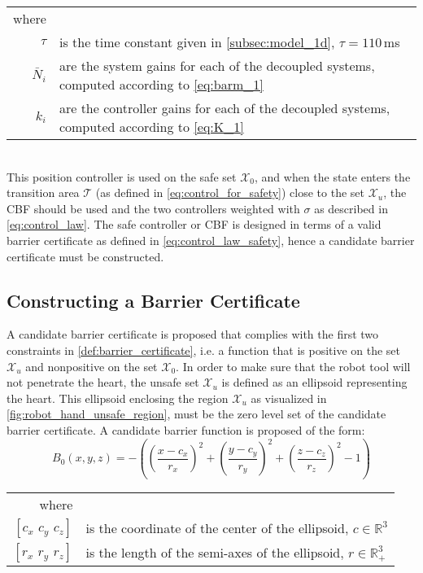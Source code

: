 \begin{tabular}{rl}
where & \\
$\tau$ & is the time constant given in \autoref{subsec:model_1d}, $\tau = 110$\,ms\\
$\bar{N}_i$ & are the system gains for each of the decoupled systems, computed according to \autoref{eq:barm_1}\\
$k_i$ & are the controller gains for each of the decoupled systems, computed according to \autoref{eq:K_1}\\
\end{tabular}\\

This position controller is used on the safe set $\mathcal{X}_0$, and when the state enters the transition area $\mathcal{T}$ (as defined in \autoref{eq:control_for_safety}) close to the set $\mathcal{X}_u$, the CBF should be used and the two controllers weighted with $\sigma$ as described in \autoref{eq:control_law}. The safe controller or CBF is designed in terms of a valid barrier certificate as defined in \autoref{eq:control_law_safety}, hence a candidate barrier certificate must be constructed.

\subsection{Constructing a Barrier Certificate}
A candidate barrier certificate is proposed that complies with the first two constraints in \autoref{def:barrier_certificate}, i.e. a function that is positive on the set $\mathcal{X}_u$ and nonpositive on the set $\mathcal{X}_0$. In order to make sure that the robot tool will not penetrate the heart, the unsafe set $\mathcal{X}_u$ is defined as an ellipsoid representing the heart. This ellipsoid enclosing the region $\mathcal{X}_u$ as visualized in \autoref{fig:robot_hand_unsafe_region}, must be the zero level set of the candidate barrier certificate. A candidate barrier function is proposed of the form:
\begin{equation}
B_0(x,y,z) = -\left(  \left(\frac{x-c_x}{r_x}\right)^2 + \left(\frac{y-c_y}{r_y}\right)^2 + \left(\frac{z-c_z}{r_z}\right)^2 - 1 \right)
\end{equation}
\begin{tabular}{rl}
	where&\\
	$[c_x\,\, c_y\,\, c_z]$ & is the coordinate of the center of the ellipsoid, $c\in\mathbb{R}^3$ \\
	$[r_x\,\, r_y\,\, r_z]$ & is the length of the semi-axes of the ellipsoid, $r\in\mathbb{R}^3_+$\\
\end{tabular}\\

